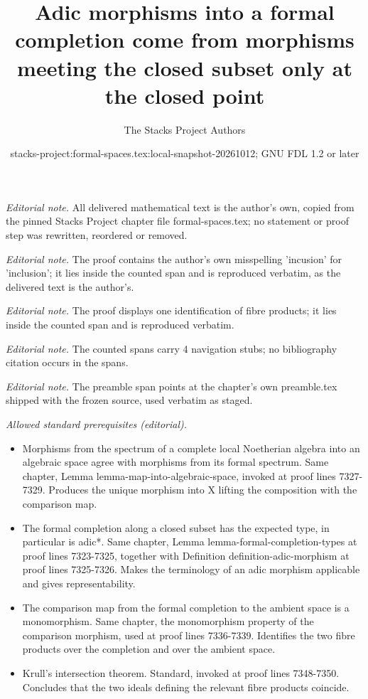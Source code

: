 \documentclass{stacks-project}
\title{Adic morphisms into a formal completion come from morphisms meeting the closed subset only at the closed point}
\author{The Stacks Project Authors}
\date{stacks-project:formal-spaces.tex:local-snapshot-20261012; GNU FDL 1.2 or later}
\theoremstyle{plain}
\theoremstyle{definition}
\theoremstyle{remark}
\numberwithin{equation}{subsection}
\begin{document}
\maketitle
\noindent\textit{Editorial note.} All delivered mathematical text is the author's own, copied from the pinned Stacks Project chapter file formal-spaces.tex; no statement or proof step was rewritten, reordered or removed.\par\medskip
\noindent\textit{Editorial note.} The proof contains the author's own misspelling 'incusion' for 'inclusion'; it lies inside the counted span and is reproduced verbatim, as the delivered text is the author's.\par\medskip
\noindent\textit{Editorial note.} The proof displays one identification of fibre products; it lies inside the counted span and is reproduced verbatim.\par\medskip
\noindent\textit{Editorial note.} The counted spans carry 4 navigation stubs; no bibliography citation occurs in the spans.\par\medskip
\noindent\textit{Editorial note.} The preamble span points at the chapter's own preamble.tex shipped with the frozen source, used verbatim as staged.\par\medskip
\noindent\textit{Allowed standard prerequisites (editorial).}\begin{itemize}
\item Morphisms from the spectrum of a complete local Noetherian algebra into an algebraic space agree with morphisms from its formal spectrum. Same chapter, Lemma lemma-map-into-algebraic-space, invoked at proof lines 7327-7329. Produces the unique morphism into X lifting the composition with the comparison map.
\item The formal completion along a closed subset has the expected type, in particular is adic*. Same chapter, Lemma lemma-formal-completion-types at proof lines 7323-7325, together with Definition definition-adic-morphism at proof lines 7325-7326. Makes the terminology of an adic morphism applicable and gives representability.
\item The comparison map from the formal completion to the ambient space is a monomorphism. Same chapter, the monomorphism property of the comparison morphism, used at proof lines 7336-7339. Identifies the two fibre products over the completion and over the ambient space.
\item Krull's intersection theorem. Standard, invoked at proof lines 7348-7350. Concludes that the two ideals defining the relevant fibre products coincide.
\end{itemize}\medskip
\end{document}

